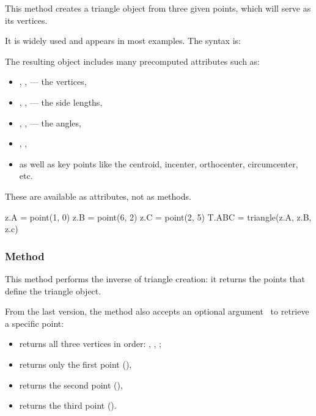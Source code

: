 This method creates a triangle object from three given points, which will serve as its vertices.

\medskip

It is widely used and appears in most examples. The syntax is:

\begin{center}
\end{center}


The resulting object includes many precomputed attributes such as:
\begin{itemize}
  \item {}, ,  — the vertices,
  \item {}, ,  — the side lengths,
  \item {}, ,  — the angles,
  \item {}, ,
  \item as well as key points like the centroid, incenter, orthocenter, circumcenter, etc.
\end{itemize}


These are available as attributes, not as methods.

\vspace{1em}
\begin{mybox}
  \begin{tkzexample}
    z.A = point(1, 0)
    z.B = point(6, 2)
    z.C = point(2, 5)
    T.ABC = triangle(z.A, z.B, z.c)
  \end{tkzexample}
\end{mybox}

\subsubsection{Method }
\label{ssub:method_triangle_get}

This method performs the inverse of triangle creation: it returns the points that define the triangle object.

\medskip

From the last version, the method also accepts an optional argument~ to retrieve a specific point:
\begin{itemize}
  \item {} returns all three vertices in order: , , ;
  \item {} returns only the first point (),
  \item {} returns the second point (),
  \item {} returns the third point ().
\end{itemize}

